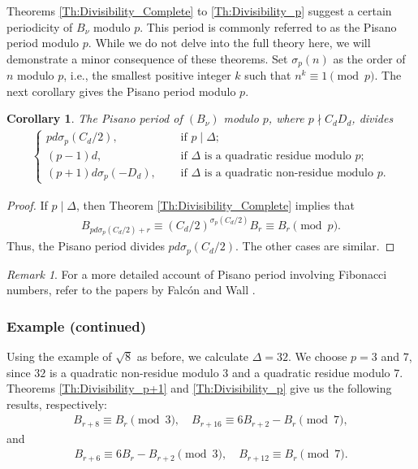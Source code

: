 \documentclass[12pt]{article}
\theoremstyle{plain}
\newtheorem{corollary}[theorem]{Corollary}
\theoremstyle{definition}
\theoremstyle{remark}
\newtheorem{remark}[theorem]{Remark}
\begin{document}
Theorems \ref{Th:Divisibility_Complete} to \ref{Th:Divisibility_p} suggest a certain periodicity of $ B_\nu $ modulo $ p $. This period is commonly referred to as the Pisano period modulo $ p $. While we do not delve into the full theory here, we will demonstrate a minor consequence of these theorems. Set $ \sigma_p (n) $ as the order of $ n $ modulo $ p $, i.e., the smallest positive integer $ k $ such that $ n^k \equiv 1 \pmod p $. The next corollary gives the Pisano period modulo $ p $.
\begin{corollary} The Pisano period of $ (B_\nu) $ modulo $ p $, where $ p \nmid C_d D_d $, divides 
\begin{align*}
	\begin{cases} pd \sigma_p (C_d/2), &\quad \text{ if } p \mid \Delta; \\ (p - 1)d, &\quad \text{ if } \Delta \text{ is a quadratic residue modulo } p; \\ (p + 1)d \sigma_p (-D_d), &\quad \text{ if } \Delta \text{ is a quadratic non-residue modulo } p. \end{cases}
\end{align*}
\end{corollary}

\begin{proof}
If $ p \mid \Delta $, then Theorem \ref{Th:Divisibility_Complete} implies that 
\begin{align*}
	B_{pd \sigma_p (C_d/2) + r} \equiv (C_d/2)^{\sigma_p (C_d/2)} B_r \equiv B_r \pmod{p}.
\end{align*}
Thus, the Pisano period divides $ pd \sigma_p (C_d/2) $. The other cases are similar.
\end{proof}

\begin{remark} For a more detailed account of Pisano period involving Fibonacci numbers, refer to the papers by Falc\'{o}n \cite{Falcon_Plaza_09} and Wall \cite{Wall_60}.
\end{remark}

\subsubsection{Example (continued)}

Using the example of $ \sqrt{8} $ as before, we calculate $ \Delta = 32 $. We choose $ p = 3 $ and $ 7 $, since $ 32 $ is a quadratic non-residue modulo $ 3 $ and a quadratic residue modulo $ 7 $. Theorems \ref{Th:Divisibility_p+1} and \ref{Th:Divisibility_p} give us the following results, respectively:
\begin{align*}
	B_{r + 8} \equiv B_r \pmod{3}, \quad B_{r + 16} \equiv 6B_{r + 2} - B_r \pmod{7},
\end{align*}
and 
\begin{align*}
	B_{r + 6} \equiv 6B_r - B_{r + 2} \pmod{3}, \quad B_{r + 12} \equiv B_r \pmod{7}.
\end{align*}
\end{document}
